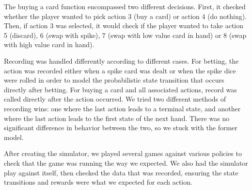 \documentclass{article}
\begin{document}
The buying a card function encompassed two different decisions. First, it checked whether the player wanted to pick action 3 (buy a card) or action 4 (do nothing). Then, if action 3 was selected, it would check if the player wanted to take action 5 (discard), 6 (swap with spike), 7 (swap with low value card in hand) or 8 (swap with high value card in hand).

Recording was handled differently according to different cases. For betting, the action was recorded either when a spike card was dealt or when the spike dice were rolled in order to model the probabilistic state transition that occurs directly after betting. For buying a card and all associated actions, record was called directly after the action occurred. We tried two different methods of recording wins: one where the last action leads to a terminal state, and another where the last action leads to the first state of the next hand. There was no significant difference in behavior between the two, so we stuck with the former model.

After creating the simulator, we played several games against various policies to check that the game was running the way we expected. We also had the simulator play against itself, then checked the data that was recorded, ensuring the state transitions and rewards were what we expected for each action.
\end{document}
